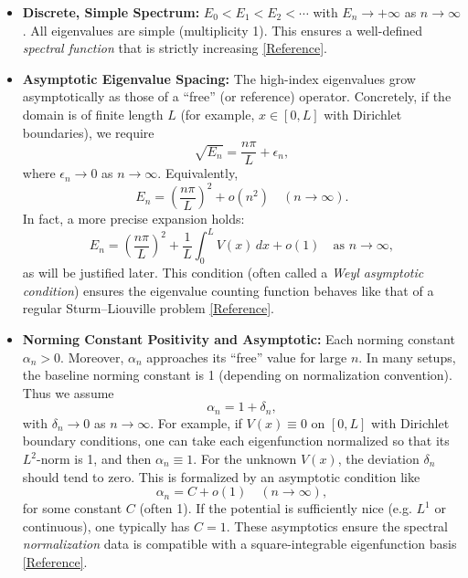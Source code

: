\documentclass[12pt]{article}
\begin{document}
\begin{itemize}[leftmargin=*, labelsep=5mm]
    \item \textbf{Discrete, Simple Spectrum:} \(E_0 < E_1 < E_2 < \cdots\) with \(E_n \to +\infty\) as \(n\to\infty\). All eigenvalues are simple (multiplicity 1). This ensures a well-defined \emph{spectral function} that is strictly increasing \href{http://www.kurims.kyoto-u.ac.jp/EMIS/journals/EJDE/Volumes/2015/27/ashrafyan.pdf#:~:text=prob%02lem%20%281.1%29,eigenvalues%20are%20enumerated%20in%20the}{[Reference]}.
    
    \item \textbf{Asymptotic Eigenvalue Spacing:} The high-index eigenvalues grow asymptotically as those of a “free” (or reference) operator. Concretely, if the domain is of finite length \(L\) (for example, \(x\in[0,L]\) with Dirichlet boundaries), we require 
    \[
    \sqrt{E_n} = \frac{n\pi}{L} + \epsilon_n,
    \]
    where \(\epsilon_n \to 0\) as \(n\to\infty\). Equivalently,
    \[
    E_n = \left(\frac{n\pi}{L}\right)^2 + o(n^2) \quad (n\to\infty).
    \]
    In fact, a more precise expansion holds:
    \[
    E_n = \left(\frac{n\pi}{L}\right)^2 + \frac{1}{L}\int_0^L V(x)\,dx + o(1) \quad \text{as } n\to\infty,
    \]
    as will be justified later. This condition (often called a \emph{Weyl asymptotic condition}) ensures the eigenvalue counting function behaves like that of a regular Sturm–Liouville problem \href{http://www.kurims.kyoto-u.ac.jp/EMIS/journals/EJDE/Volumes/2015/27/ashrafyan.pdf#:~:text=Thus%2C%20if%20we%20have%20a,1%2C%20there%20exist%20a%20function}{[Reference]}.
    
    \item \textbf{Norming Constant Positivity and Asymptotic:} Each norming constant \(\alpha_n>0\). Moreover, \(\alpha_n\) approaches its “free” value for large \(n\). In many setups, the baseline norming constant is 1 (depending on normalization convention). Thus we assume 
    \[
    \alpha_n = 1 + \delta_n,
    \]
    with \(\delta_n \to 0\) as \(n\to\infty\). For example, if \(V(x)\equiv0\) on \([0,L]\) with Dirichlet boundary conditions, one can take each eigenfunction normalized so that its \(L^2\)-norm is 1, and then \(\alpha_n \equiv 1\). For the unknown \(V(x)\), the deviation \(\delta_n\) should tend to zero. This is formalized by an asymptotic condition like 
    \[
    \alpha_n = C + o(1) \quad (n\to\infty),
    \]
    for some constant \(C\) (often 1). If the potential is sufficiently nice (e.g. \(L^1\) or continuous), one typically has \(C=1\). These asymptotics ensure the spectral \emph{normalization} data is compatible with a square-integrable eigenfunction basis \href{http://www.kurims.kyoto-u.ac.jp/EMIS/journals/EJDE/Volumes/2015/27/ashrafyan.pdf#:~:text=Thus%2C%20if%20we%20have%20a,1%2C%20there%20exist%20a%20function}{[Reference]}.
    

\end{itemize}
\end{document}
